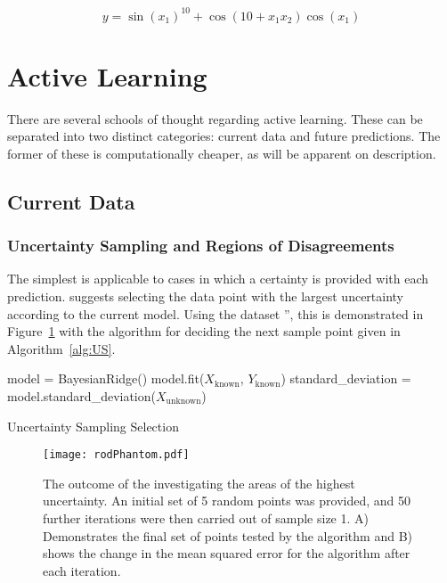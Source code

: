 \begin{equation}
  y = \sin{(x_1)}^{10} + \cos{(10 + x_1 x_2)}\cos{(x_1)}
  \label{eq:phantom}
\end{equation}

\section{Active Learning}
\label{ch:Active Learning}

There are several schools of thought regarding active learning. These can be separated into two distinct categories: current data and future predictions. The former of these is computationally cheaper, as will be apparent on description.

\subsection{Current Data}

\subsubsection{Uncertainty Sampling and Regions of Disagreements}
\label{sec:UncertaintySampling}

The simplest is applicable to cases in which a certainty is provided with each prediction. \textcite{Set09} suggests selecting the data point with the largest uncertainty according to the current model. Using the dataset '', this is demonstrated in Figure~\ref{fig:rodPhantom} with the algorithm for deciding the next sample point given in Algorithm~\ref{alg:US}.

\begin{algorithm}[h]
  model = BayesianRidge()\;
  model.fit($X_\mathrm{known}$, $Y_\mathrm{known}$)\;
  standard\_deviation = model.standard\_deviation($X_\mathrm{unknown}$)\;
  \caption{Uncertainty Sampling Selection}
  \label{alg:US}\SetAlgoLined
\end{algorithm}


\begin{figure}[H]
  \begin{center}
    \texttt{[image: rodPhantom.pdf]}
    \caption[Uncertainty Sampling Demonstration]{The outcome of the investigating the areas of the highest uncertainty. An initial set of 5 random points was provided, and 50 further iterations were then carried out of sample size 1. A) Demonstrates the final set of points tested by the algorithm and B) shows the change in the mean squared error for the algorithm after each iteration.}
    \label{fig:rodPhantom}
  \end{center}
\end{figure}

